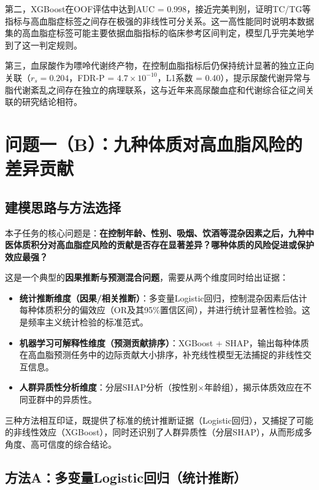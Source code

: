\documentclass[12pt,a4paper]{ctexart}
\begin{document}
第二，XGBoost在OOF评估中达到AUC = 0.998，接近完美判别，证明TC/TG等指标与高血脂症标签之间存在极强的非线性可分关系。这一高性能同时说明本数据集的高血脂症标签可能主要依据血脂指标的临床参考区间判定，模型几乎完美地学到了这一判定规则。

第三，血尿酸作为嘌呤代谢终产物，在控制血脂指标后仍保持统计显著的独立正向关联（$r_s = 0.204$，FDR-P = $4.7\times10^{-10}$，L1系数 = 0.40），提示尿酸代谢异常与脂代谢紊乱之间存在独立的病理联系，这与近年来高尿酸血症和代谢综合征之间关联的研究结论相符。


\section{问题一（B）：九种体质对高血脂风险的差异贡献}

\subsection{建模思路与方法选择}

本子任务的核心问题是：\textbf{在控制年龄、性别、吸烟、饮酒等混杂因素之后，九种中医体质积分对高血脂症风险的贡献是否存在显著差异？哪种体质的风险促进或保护效应最强？}

这是一个典型的\textbf{因果推断与预测混合问题}，需要从两个维度同时给出证据：

\begin{itemize}
  \item \textbf{统计推断维度（因果/相关推断）}：多变量Logistic回归，控制混杂因素后估计每种体质积分的偏效应（OR及其95\%置信区间），并进行统计显著性检验。这是频率主义统计检验的标准范式。
  \item \textbf{机器学习可解释性维度（预测贡献排序）}：XGBoost + SHAP，输出每种体质在高血脂预测任务中的边际贡献大小排序，补充线性模型无法捕捉的非线性交互信息。
  \item \textbf{人群异质性分析维度}：分层SHAP分析（按性别×年龄组），揭示体质效应在不同亚群中的异质性。
\end{itemize}

三种方法相互印证，既提供了标准的统计推断证据（Logistic回归），又捕捉了可能的非线性效应（XGBoost），同时还识别了人群异质性（分层SHAP），从而形成多角度、高可信度的综合结论。

\subsection{方法A：多变量Logistic回归（统计推断）}
\end{document}

